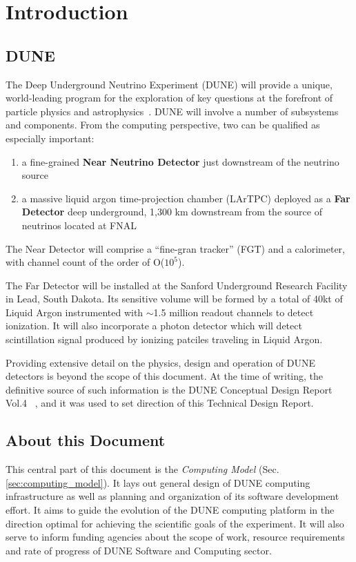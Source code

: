 \section{Introduction}
\subsection{DUNE}

The Deep Underground Neutrino Experiment (DUNE) will provide a unique, world-leading program
for the exploration of key questions at the forefront of particle physics and astrophysics~\cite{sciopps}.
DUNE will involve a number of subsystems and components. From the computing perspective, two can be
qualified as especially important:

\begin{enumerate}

\item a fine-grained \textbf{Near Neutrino Detector} just downstream of the neutrino source
\item a massive liquid argon time-projection chamber (LArTPC) deployed as a \textbf{Far
Detector} deep underground, 1,300 km downstream from the source of neutrinos located at FNAL

\end{enumerate}

The Near Detector will comprise a ``fine-gran tracker'' (FGT) and a calorimeter, with channel count of the order of O($10^{5}$).

The Far Detector will be installed at the Sanford Underground Research Facility in Lead, South Dakota.
Its sensitive volume will be formed by a total of 40kt of Liquid Argon instrumented with $\sim$1.5 million readout
channels to detect ionization. It will also incorporate a photon detector which will detect scintillation
signal produced by ionizing patciles traveling in Liquid Argon.

Providing extensive detail on the physics, design and operation of DUNE detectors  is beyond the scope of this document.
At the time of writing, the definitive source of such information is the DUNE Conceptual Design Report Vol.4 ~\cite{cdr_vol4_docdb}, and 
it was used to set direction of this Technical Design Report.


\subsection{About this Document}
\label{sec:modelrole}

This central part of this document is the \textit{Computing Model} (Sec.\ref{sec:computing_model}).
It lays out general design of DUNE computing infrastructure as well as planning and organization of
its software development effort. It aims to guide the evolution of the DUNE computing platform in the
direction optimal for achieving the scientific goals of the experiment. It will also serve to inform funding
agencies about the scope of work, resource requirements and rate of progress of  DUNE Software
and Computing sector.

